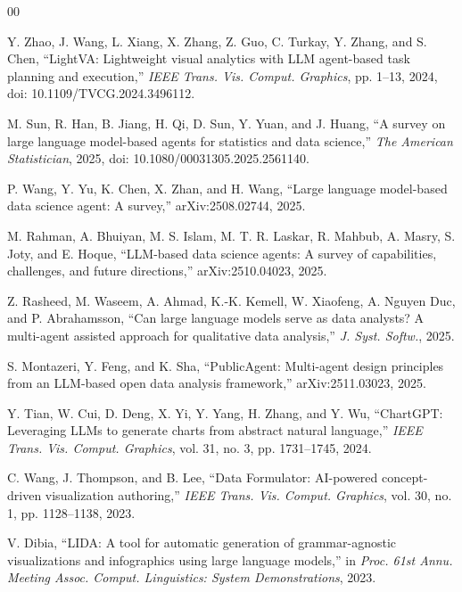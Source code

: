 \documentclass[conference]{IEEEtran}
\begin{document}
\begin{thebibliography}{00}

 Y. Zhao, J. Wang, L. Xiang, X. Zhang, Z. Guo, C. Turkay, Y. Zhang, and S. Chen, ``LightVA: Lightweight visual analytics with LLM agent-based task planning and execution,'' \textit{IEEE Trans. Vis. Comput. Graphics}, pp. 1--13, 2024, doi: 10.1109/TVCG.2024.3496112.

 M. Sun, R. Han, B. Jiang, H. Qi, D. Sun, Y. Yuan, and J. Huang, ``A survey on large language model-based agents for statistics and data science,'' \textit{The American Statistician}, 2025, doi: 10.1080/00031305.2025.2561140.

 P. Wang, Y. Yu, K. Chen, X. Zhan, and H. Wang, ``Large language model-based data science agent: A survey,'' arXiv:2508.02744, 2025.

 M. Rahman, A. Bhuiyan, M. S. Islam, M. T. R. Laskar, R. Mahbub, A. Masry, S. Joty, and E. Hoque, ``LLM-based data science agents: A survey of capabilities, challenges, and future directions,'' arXiv:2510.04023, 2025.

 Z. Rasheed, M. Waseem, A. Ahmad, K.-K. Kemell, W. Xiaofeng, A. Nguyen Duc, and P. Abrahamsson, ``Can large language models serve as data analysts? A multi-agent assisted approach for qualitative data analysis,'' \textit{J. Syst. Softw.}, 2025.

 S. Montazeri, Y. Feng, and K. Sha, ``PublicAgent: Multi-agent design principles from an LLM-based open data analysis framework,'' arXiv:2511.03023, 2025.

 Y. Tian, W. Cui, D. Deng, X. Yi, Y. Yang, H. Zhang, and Y. Wu, ``ChartGPT: Leveraging LLMs to generate charts from abstract natural language,'' \textit{IEEE Trans. Vis. Comput. Graphics}, vol. 31, no. 3, pp. 1731--1745, 2024.

 C. Wang, J. Thompson, and B. Lee, ``Data Formulator: AI-powered concept-driven visualization authoring,'' \textit{IEEE Trans. Vis. Comput. Graphics}, vol. 30, no. 1, pp. 1128--1138, 2023.

 V. Dibia, ``LIDA: A tool for automatic generation of grammar-agnostic visualizations and infographics using large language models,'' in \textit{Proc. 61st Annu. Meeting Assoc. Comput. Linguistics: System Demonstrations}, 2023.


\end{thebibliography}
\end{document}
